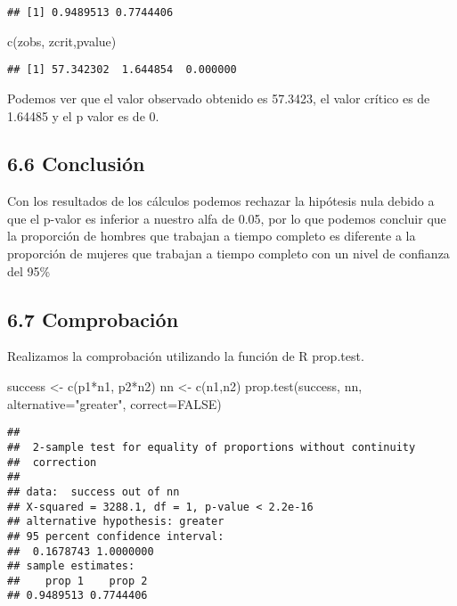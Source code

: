 \documentclass[
  a4paper]{article}
\newenvironment{Shaded}{\begin{snugshade}}{\end{snugshade}}
\newcommand{\AttributeTok}[1]{\textcolor[rgb]{0.77,0.63,0.00}{#1}}
\newcommand{\ConstantTok}[1]{\textcolor[rgb]{0.00,0.00,0.00}{#1}}
\newcommand{\FunctionTok}[1]{\textcolor[rgb]{0.00,0.00,0.00}{#1}}
\newcommand{\NormalTok}[1]{#1}
\newcommand{\OtherTok}[1]{\textcolor[rgb]{0.56,0.35,0.01}{#1}}
\newcommand{\SpecialCharTok}[1]{\textcolor[rgb]{0.00,0.00,0.00}{#1}}
\newcommand{\StringTok}[1]{\textcolor[rgb]{0.31,0.60,0.02}{#1}}
\begin{document}
\begin{verbatim}
## [1] 0.9489513 0.7744406
\end{verbatim}

\begin{Shaded}
\begin{Highlighting}[]
\FunctionTok{c}\NormalTok{(zobs, zcrit,pvalue)}
\end{Highlighting}
\end{Shaded}

\begin{verbatim}
## [1] 57.342302  1.644854  0.000000
\end{verbatim}

Podemos ver que el valor observado obtenido es 57.3423, el valor crítico
es de 1.64485 y el p valor es de 0.

\hypertarget{conclusiuxf3n-3}{%
\subsection{6.6 Conclusión}\label{conclusiuxf3n-3}}

Con los resultados de los cálculos podemos rechazar la hipótesis nula
debido a que el p-valor es inferior a nuestro alfa de 0.05, por lo que
podemos concluir que la proporción de hombres que trabajan a tiempo
completo es diferente a la proporción de mujeres que trabajan a tiempo
completo con un nivel de confianza del 95\%

\hypertarget{comprobaciuxf3n-3}{%
\subsection{6.7 Comprobación}\label{comprobaciuxf3n-3}}

Realizamos la comprobación utilizando la función de R prop.test.

\begin{Shaded}
\begin{Highlighting}[]
\NormalTok{success }\OtherTok{\textless{}{-}} \FunctionTok{c}\NormalTok{(p1}\SpecialCharTok{*}\NormalTok{n1, p2}\SpecialCharTok{*}\NormalTok{n2)}
\NormalTok{nn }\OtherTok{\textless{}{-}} \FunctionTok{c}\NormalTok{(n1,n2)}
\FunctionTok{prop.test}\NormalTok{(success, nn, }\AttributeTok{alternative=}\StringTok{"greater"}\NormalTok{, }\AttributeTok{correct=}\ConstantTok{FALSE}\NormalTok{)}
\end{Highlighting}
\end{Shaded}

\begin{verbatim}
## 
##  2-sample test for equality of proportions without continuity
##  correction
## 
## data:  success out of nn
## X-squared = 3288.1, df = 1, p-value < 2.2e-16
## alternative hypothesis: greater
## 95 percent confidence interval:
##  0.1678743 1.0000000
## sample estimates:
##    prop 1    prop 2 
## 0.9489513 0.7744406
\end{verbatim}
\end{document}
